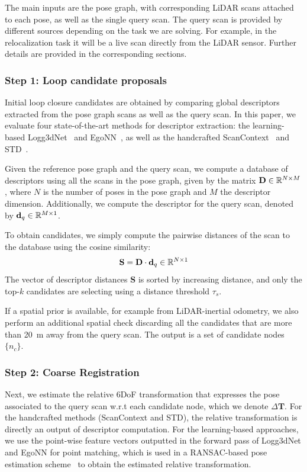 The main inputs are the pose graph, with corresponding LiDAR scans attached to each pose, as well as the single query scan. The query scan is provided by different sources depending on the task we are solving. For example, in the relocalization task it will be a live scan directly from the LiDAR sensor. Further details are provided in the corresponding sections.

\subsubsection{\textbf{Step 1: Loop candidate proposals}}
\label{subsubsec:loop-candidate}
Initial loop closure candidates are obtained by comparing global descriptors extracted from the pose graph scans as well as the query scan. In this paper, we evaluate four state-of-the-art methods for descriptor extraction: the learning-based Logg3dNet~\cite{vidanapathirana2022icra} and EgoNN~\cite{komorowski2022ral}, as well as the handcrafted ScanContext~\cite{kim2018iros} and STD~\cite{yuan2023icra}.

Given the reference pose graph and the query scan, we compute a database of descriptors using all the scans in the pose graph, given by the matrix $\mathbf{D} \in \mathbb{R}^{N\times M}$, where $N$ is the number of poses in the pose graph and $M$ the descriptor dimension. Additionally, we compute the descriptor for the query scan, denoted by $\mathbf{d}_{q} \in \mathbb{R}^{M \times 1}$. 

To obtain candidates, we simply compute the pairwise distances of the scan to the database using the cosine similarity:
\begin{equation}
  \mathbf{S} = \mathbf{D} \cdot \mathbf{d}_{q} \in \mathbb{R}^{N \times 1}
\end{equation}
The vector of descriptor distances $\mathbf{S}$ is sorted by increasing distance, and only the top-$k$ candidates are selecting using a distance threshold $\tau_{s}$.

If a spatial prior is available, for example from LiDAR-inertial odometry, we also perform an additional spatial check discarding all the candidates that are more than \SI{20}{\meter} away from the query scan. The output is a set of candidate nodes $\{ n_c\}$.

\subsubsection{\textbf{Step 2: Coarse Registration}}
\label{subsubsec:coarse-registration}
Next, we estimate the relative 6DoF transformation that expresses the pose associated to the query scan w.r.t each candidate node, which we denote $\Delta \mathbf{T}$. For the handcrafted methods (ScanContext and STD), the relative transformation is directly an output of descriptor computation. For the learning-based approaches, we use the point-wise feature vectors outputted in the forward pass of Logg3dNet and EgoNN for point matching, which is used in a RANSAC-based pose estimation scheme~\cite{fischler1981ransac} to obtain the estimated relative transformation.

